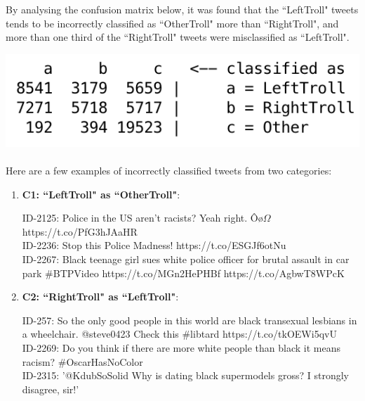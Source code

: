 \documentclass[11pt]{article}
\begin{document}
By analysing the confusion matrix below, it was found that the ``LeftTroll" tweets tends to be incorrectly classified as ``OtherTroll" more than ``RightTroll", and more than one third of the ``RightTroll" tweets were misclassified as ``LeftTroll".


\includegraphics[scale=0.65]{"conf-matrix"}

\paragraph{} Here are a few examples of incorrectly classified tweets from two categories:

\begin{enumerate}

\item
\textbf{C1: ``LeftTroll" as ``OtherTroll"}:

ID-2125: Police in the US aren't racists? Yeah right. Ôø$\Omega$ https://t.co/PfG3hJAaHR \\

ID-2236: Stop this Police Madness!  https://t.co/ESGJf6otNu \\

ID-2267: Black teenage girl sues white police officer for brutal assault in car park \#BTPVideo  https://t.co/MGn2HePHBf https://t.co/AgbwT8WPcK


\item
\textbf{C2: ``RightTroll" as ``LeftTroll"}:

ID-257: So the only good people in this world are black transexual lesbians in a wheelchair. @steve0423 Check this \#libtard https://t.co/tkOEWi5qvU \\

ID-2269: Do you think if there are more white people than black it means racism?  \#OscarHasNoColor \\

ID-2315: ’@KdubSoSolid Why is dating black supermodels gross? I strongly disagree, sir!' \\

\end{enumerate}
\end{document}
